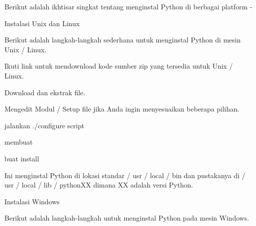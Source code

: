 \documentclass[a4paper,12pt]{report}
\begin{document}
\vspace{14pt}
\noindent 
{\fontsize{14pt}{14pt}\selectfont Berikut adalah ikhtisar singkat tentang menginstal Python di berbagai platform - \\} \par
\vspace{14pt}
\noindent 
{\fontsize{14pt}{14pt}\selectfont Instalasi Unix dan Linux \\} \par
\noindent 
{\fontsize{14pt}{14pt}\selectfont Berikut adalah langkah-langkah sederhana untuk menginstal Python di mesin Unix / Linux. \\} \par
\noindent 
{\fontsize{14pt}{14pt}\selectfont Ikuti link untuk mendownload kode sumber zip yang tersedia untuk Unix / Linux. \\} \par
\vspace{14pt}
\noindent 
{\fontsize{14pt}{14pt}\selectfont Download dan ekstrak file. \\} \par
\vspace{14pt}
\noindent 
{\fontsize{14pt}{14pt}\selectfont Mengedit Modul / Setup file jika Anda ingin menyesuaikan beberapa pilihan. \\} \par
\vspace{14pt}
\noindent 
{\fontsize{14pt}{14pt}\selectfont jalankan ./configure script \\} \par
\vspace{14pt}
\noindent 
{\fontsize{14pt}{14pt}\selectfont membuat \\} \par
\vspace{14pt}
\noindent 
{\fontsize{14pt}{14pt}\selectfont buat install \\} \par
\vspace{14pt}
\noindent 
{\fontsize{14pt}{14pt}\selectfont Ini menginstal Python di lokasi standar / usr / local / bin dan pustakanya di / usr / local / lib / pythonXX dimana XX adalah versi Python. \\} \par
\vspace{14pt}
\noindent 
{\fontsize{14pt}{14pt}\selectfont Instalasi Windows \\} \par
\noindent 
{\fontsize{14pt}{14pt}\selectfont Berikut adalah langkah-langkah untuk menginstal Python pada mesin Windows. \\} \par
\end{document}
